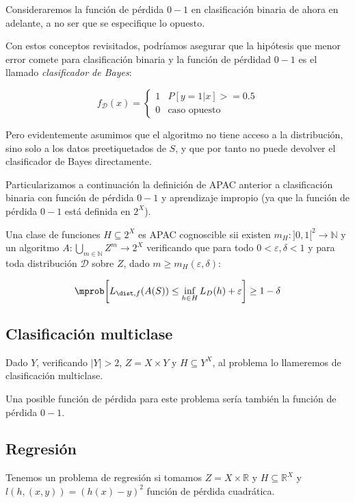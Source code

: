 Consideraremos la función de pérdida $0-1$ en clasificación binaria de ahora en adelante, a no ser que se especifique
lo opuesto.

Con estos conceptos revisitados, podríamos asegurar que la hipótesis que menor error comete para 
clasificación binaria y la función de pérdidad $0-1$ es el llamado \textit{clasificador de Bayes}:

\[f_{\mathcal{D}}(x) = \left\{\begin{array}{ll}
1 & P [y = 1 |x] >= 0.5\\
0 & \textrm{caso opuesto}
\end{array}\right.\]

Pero evidentemente asumimos que el algoritmo no tiene acceso a la distribución, sino solo a los datos 
preetiquetados de $S$, y que por tanto no puede devolver el clasificador de Bayes directamente.

Particularizamos a continuación la definición de APAC anterior a clasificación binaria
con función de pérdida $0-1$ y aprendizaje impropio (ya que la función de pérdida $0-1$ está definida 
en $2^X$).

\begin{definition}
Una clase de funciones $H \subseteq 2^X$ es APAC cognoscible sii existen 
$m_{H} : ]0,1[^2\rightarrow \mathbb{N}$ y un algoritmo $A: \underset{m\in \mathbb{N}}{\bigcup} Z^m \rightarrow 2^X$ verificando que para todo
$0 < \varepsilon, \delta < 1$ y para toda distribución $\mathcal{D}$ sobre $Z$, dado $m \ge m_H(\varepsilon, \delta)$:

\[\mprob \bigg[L_{\dist,f}(A(S)) \le \inf_{h\in H} L_D(h) + \varepsilon \bigg] \ge 1-\delta \]
\end{definition}

\subsection{Clasificación multiclase}
Dado $Y$, verificando $|Y| > 2$, $Z=X\times Y$ y $H\subseteq Y^X$, al problema lo llameremos de 
clasificación multiclase. 

Una posible función de pérdida para este problema sería también la función de pérdida $0-1$.

\subsection{Regresión}
Tenemos un problema de regresión si tomamos $Z=X \times \mathbb{R}$ y $H\subseteq \mathbb{R}^X$
y $l(h,(x,y)) = (h(x)-y)^2$ función de pérdida cuadrática.

